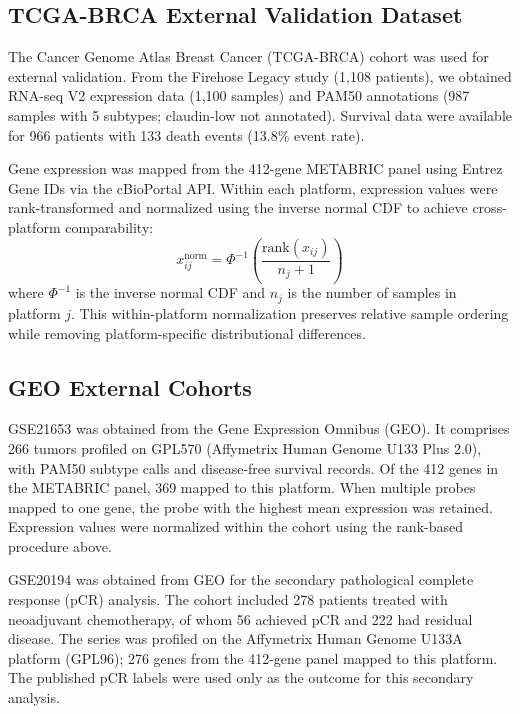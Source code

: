 \documentclass[10pt,journal,compsoc,twocolumn]{IEEEtran}
\begin{document}
\subsection{TCGA-BRCA External Validation Dataset}
The Cancer Genome Atlas Breast Cancer (TCGA-BRCA) cohort \cite{cancer2012comprehensive} was used for external validation. From the Firehose Legacy study (1,108 patients), we obtained RNA-seq V2 expression data (1,100 samples) and PAM50 annotations (987 samples with 5 subtypes; claudin-low not annotated). Survival data were available for 966 patients with 133 death events (13.8\% event rate).

Gene expression was mapped from the 412-gene METABRIC panel using Entrez Gene IDs via the cBioPortal API. Within each platform, expression values were rank-transformed and normalized using the inverse normal CDF to achieve cross-platform comparability:
\begin{equation}
  x_{ij}^{\text{norm}} = \Phi^{-1}\left(\frac{\text{rank}(x_{ij})}{n_j + 1}\right)
  \label{eq:rank_norm}
\end{equation}
where $\Phi^{-1}$ is the inverse normal CDF and $n_j$ is the number of samples in platform $j$. This within-platform normalization preserves relative sample ordering while removing platform-specific distributional differences.

\subsection{GEO External Cohorts}
GSE21653 was obtained from the Gene Expression Omnibus (GEO). It comprises 266 tumors profiled on GPL570 (Affymetrix Human Genome U133 Plus 2.0), with PAM50 subtype calls and disease-free survival records. Of the 412 genes in the METABRIC panel, 369 mapped to this platform. When multiple probes mapped to one gene, the probe with the highest mean expression was retained. Expression values were normalized within the cohort using the rank-based procedure above.

GSE20194 was obtained from GEO for the secondary pathological complete response (pCR) analysis. The cohort included 278 patients treated with neoadjuvant chemotherapy, of whom 56 achieved pCR and 222 had residual disease. The series was profiled on the Affymetrix Human Genome U133A platform (GPL96); 276 genes from the 412-gene panel mapped to this platform. The published pCR labels were used only as the outcome for this secondary analysis.
\end{document}
